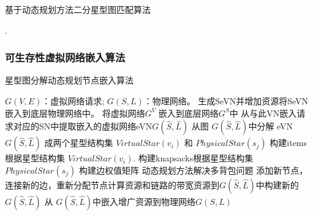 \begin{frame}
\begin{algorithm}[H]
\label{alg:DPAlg}
\caption{基于动态规划方法二分星型图匹配算法}
\tiny{
\begin{algorithmic}[1]
.
\ENDFOR
\ENDFOR
{}
\end{algorithmic}
}
\end{algorithm}
\end{frame}

\begin{frame}
\frametitle{可生存性虚拟网络嵌入算法}
\begin{algorithm}[H]
\label{alg:SeVNAlg}
\caption{星型图分解动态规划节点嵌入算法}
\tiny{
\begin{algorithmic}[1]
\REQUIRE $G (V,E)$：虚拟网络请求; $G (S,L)$：物理网络。
\ENSURE 生成SeVN并增加资源将SeVN嵌入到底层物理网络中。
\STATE 将虚拟网络$G^V$ 嵌入到底层网络$G^S$中
\STATE 从与此VN嵌入请求对应的SN中提取嵌入的虚拟网络eVN$G\left( {\hat S,\hat L} \right)$
\STATE  从图 $G\left( {\hat S,\hat L} \right)$中分解 eVN $G\left( {\hat S,\hat L} \right)$ 成两个星型结构集 $VirtualStar(v_i)$ 和 $PhysicalStar(s_j)$
\STATE 构建items根据星型结构集 $VirtualStar(v_i)$.
\STATE 构建knapsacks根据星型结构集$PhysicalStar(s_j)$
\STATE 构建边权值矩阵
\STATE 动态规划方法解决多背包问题
\STATE 添加新节点，连接新的边，重新分配节点计算资源和链路的带宽资源到$G\left( {\hat S,\hat L} \right)$中构建新的$G\left( {\hat S,\hat L} \right)$
\ENDFOR
\STATE 从 $G\left( {\hat S,\hat L} \right)$中嵌入增广资源到物理网络$G(S,L)$
\end{algorithmic}
}
\end{algorithm}
\end{frame}

